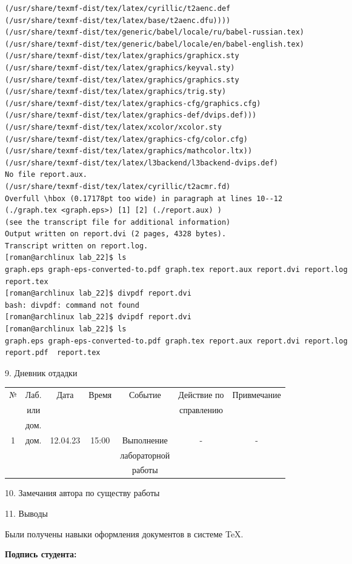 \documentclass[12pt]{article}
\begin{document}
\begin{verbatim}
(/usr/share/texmf-dist/tex/latex/cyrillic/t2aenc.def
(/usr/share/texmf-dist/tex/latex/base/t2aenc.dfu))))
(/usr/share/texmf-dist/tex/generic/babel/locale/ru/babel-russian.tex)
(/usr/share/texmf-dist/tex/generic/babel/locale/en/babel-english.tex)
(/usr/share/texmf-dist/tex/latex/graphics/graphicx.sty
(/usr/share/texmf-dist/tex/latex/graphics/keyval.sty)
(/usr/share/texmf-dist/tex/latex/graphics/graphics.sty
(/usr/share/texmf-dist/tex/latex/graphics/trig.sty)
(/usr/share/texmf-dist/tex/latex/graphics-cfg/graphics.cfg)
(/usr/share/texmf-dist/tex/latex/graphics-def/dvips.def)))
(/usr/share/texmf-dist/tex/latex/xcolor/xcolor.sty
(/usr/share/texmf-dist/tex/latex/graphics-cfg/color.cfg)
(/usr/share/texmf-dist/tex/latex/graphics/mathcolor.ltx))
(/usr/share/texmf-dist/tex/latex/l3backend/l3backend-dvips.def)
No file report.aux.
(/usr/share/texmf-dist/tex/latex/cyrillic/t2acmr.fd)
Overfull \hbox (0.17178pt too wide) in paragraph at lines 10--12
(./graph.tex <graph.eps>) [1] [2] (./report.aux) )
(see the transcript file for additional information)
Output written on report.dvi (2 pages, 4328 bytes).
Transcript written on report.log.
[roman@archlinux lab_22]$ ls
graph.eps graph-eps-converted-to.pdf graph.tex report.aux report.dvi report.log 
report.tex
[roman@archlinux lab_22]$ divpdf report.dvi 
bash: divpdf: command not found
[roman@archlinux lab_22]$ dvipdf report.dvi 
[roman@archlinux lab_22]$ ls
graph.eps graph-eps-converted-to.pdf graph.tex report.aux report.dvi report.log 
report.pdf  report.tex
\end{verbatim}



\newpage
{\Large 9. Дневник отдадки}

\begin{tabular}{|c|c|c|c|c|c|c|}
\hline
№ & Лаб. & Дата & Время & Событие & Действие по & Привмечание\\ 
&или & & & & справлению & \\ 
&дом. & & & & & \\
\hline
1 & дом. & 12.04.23 & 15:00 & Выполнение  & - & -\\
& & & & лабораторной & & \\
& & & & работы & & \\
\hline
\end{tabular}


{\Large 10. Замечания автора по существу работы}


{\Large 11. Выводы}

Были получены навыки оформления документов в системе \TeX.

{\bfseries Подпись студента:} \underline{\hspace{3cm}}
\end{document}
